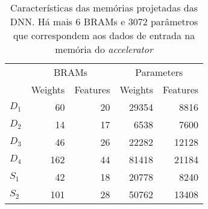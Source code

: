 \begin{table}[ht!]
\centering
\caption{Características das memórias projetadas das DNN. Há mais 6 BRAMs e 3072 parâmetros que correspondem aos dados de entrada na memória do \textit{accelerator}}
\label{tab:5-dnn-report}
\begin{tabular}{lrrrr}
\toprule
 & \multicolumn{2}{c}{BRAMs} & \multicolumn{2}{c}{Parameters} \\
\cmidrule(r){2-3} \cmidrule(l){4-5}
 & Weights & Features & Weights & Features \\
\midrule
$D_1$ & 60 & 20 & 29354 & 8816 \\
$D_2$ & 14 & 17 & 6538 & 7600 \\
$D_3$ & 46 & 26 & 22282 & 12128 \\
$D_4$ & 162 & 44 & 81418 & 21184 \\
$S_1$ & 42 & 18 & 20778 & 8240 \\
$S_2$ & 101 & 28 & 50762 & 13408 \\
\bottomrule
\end{tabular}
\end{table}